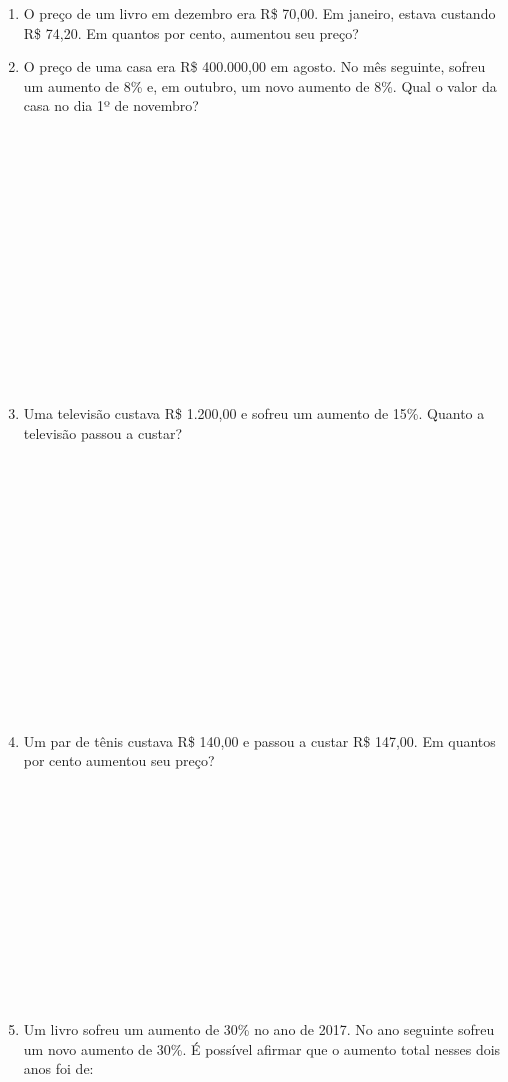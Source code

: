 \documentclass[a4paper,14pt]{article}
\begin{document}
\begin{multicols}{2}
\begin{enumerate}
			\item O preço de um livro em dezembro era R\$ 70,00. Em janeiro, estava custando R\$ 74,20. Em quantos por cento, aumentou seu preço? \newpage
			\item O preço de uma casa era R\$ 400.000,00 em agosto. No mês seguinte, sofreu um aumento de 8\% e, em outubro, um novo aumento de 8\%. Qual o valor da casa no dia 1º de novembro? \\\\\\\\\\\\\\\\\\\\\\\\\\\\\\
			\item Uma televisão custava R\$ 1.200,00 e sofreu um aumento de 15\%. Quanto a televisão passou a custar? \\\\\\\\\\\\\\\\\\\\\\\\\\\\\\
			\item Um par de tênis custava R\$ 140,00 e passou a custar R\$ 147,00. Em quantos por cento aumentou seu preço? \\\\\\\\\\\\\\\\\\\\\\\\\\
			\item Um livro sofreu um aumento de 30\% no ano de 2017. No ano seguinte sofreu um novo aumento de 30\%. É possível afirmar que o aumento total nesses dois anos foi de:

\end{enumerate}
\end{multicols}
\end{document}
